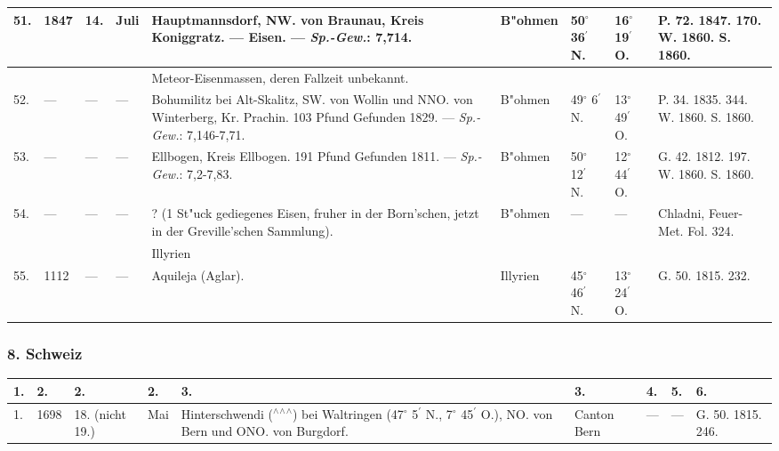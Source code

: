\documentclass[a4paper, 8pt, oneside, polutonikogreek, german]{article}
\begin{document}
\begin{center}
\begin{longtable}{|p{3mm}|p{10mm}|p{5mm}|p{13mm}|p{25mm}|p{13mm}|p{10mm}|p{10mm}|p{11mm}|}
        51. & 1847 & 14. & Juli & Hauptmannsdorf, NW. von Braunau, Kreis Koniggratz. --- Eisen. --- \emph{Sp.-Gew.}: 7,714. & B"ohmen & 50$^\circ$ 36$^\prime$ N. & 16$^\circ$ 19$^\prime$ O. & P. 72. 1847. 170. W. 1860. S. 1860. \\ \hline
          &   &   &   & Meteor-Eisenmassen, deren Fallzeit unbekannt. &   &   &   & ~ \\ \hline
        52. & --- & --- & --- & Bohumilitz bei Alt-Skalitz, SW. von Wollin und NNO. von Winterberg, Kr. Prachin. 103 Pfund Gefunden 1829. --- \emph{Sp.-Gew.}: 7,146-7,71. & B"ohmen & 49$^\circ$ 6$^\prime$ N. & 13$^\circ$ 49$^\prime$ O. & P. 34. 1835. 344. W. 1860. S. 1860. \\ \hline
        53. & --- & --- & --- & Ellbogen, Kreis Ellbogen. 191 Pfund Gefunden 1811. --- \emph{Sp.-Gew.}: 7,2-7,83. & B"ohmen & 50$^\circ$ 12$^\prime$ N. & 12$^\circ$ 44$^\prime$ O. & G. 42. 1812. 197. W. 1860. S. 1860. \\ \hline
        54. & --- & --- & --- & ? (1 St"uck gediegenes Eisen, fruher in der Born’schen, jetzt in der Greville’schen Sammlung). & B"ohmen & --- & --- & Chladni, Feuer-Met. Fol. 324. \\ \hline
         &   &   &  & Illyrien &   &   &   &   \\ \hline
        55. & 1112 & --- & --- & Aquileja (Aglar). & Illyrien & 45$^\circ$ 46$^\prime$ N. & 13$^\circ$ 24$^\prime$ O. & G. 50. 1815. 232. \\ \hline
    \end{longtable}
\end{center}
\subsubsection{8. Schweiz}
\begin{table}[H]
    \footnotesize
    \begin{longtable}{|p{3mm}|p{10mm}|p{5mm}|p{13mm}|p{25mm}|p{13mm}|p{10mm}|p{10mm}|p{11mm}|}
    \hline
        1. & 2. & 2. & 2. & 3. & 3. & 4. & 5. & 6. \\ \hline
        1. & 1698 & 18. (nicht 19.) & Mai & Hinterschwendi ($^\wedge$$^\wedge$$^\wedge$) bei Waltringen (47$^\circ$ 5$^\prime$ N., 7$^\circ$ 45$^\prime$ O.), NO. von Bern und ONO. von Burgdorf. & Canton Bern & --- & --- & G. 50. 1815. 246. \\ \hline
    \end{longtable}
\end{table}
\end{document}
